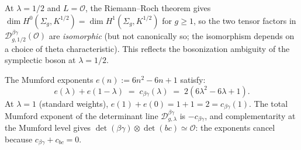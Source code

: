\begin{remark}
\label{rem:betagamma-determinant-bosonization}
At $\lambda = 1/2$ and $L = \mathcal{O}$, the Riemann--Roch theorem gives
$\dim H^0(\Sigma_g, K^{1/2}) = \dim H^1(\Sigma_g, K^{1/2})$ for
$g \geq 1$, so the two tensor factors in
$\mathcal{D}^{\beta\gamma}_{g,1/2}(\mathcal{O})$ are \emph{isomorphic}
(but not canonically so; the isomorphism depends on a choice of theta
characteristic). This reflects the bosonization ambiguity of the
symplectic boson at $\lambda = 1/2$.
\end{remark}

\begin{proposition}
\label{prop:mumford-exponent-complementarity}
\ClaimStatusProvedHere
{}
The Mumford exponents $e(n) := 6n^2 - 6n + 1$ satisfy:
\begin{equation}\label{eq:mumford-exponent-complementarity}
 e(\lambda) + e(1 - \lambda)
 \;=\;
 c_{\beta\gamma}(\lambda)
 \;=\;
 2(6\lambda^2 - 6\lambda + 1).
\end{equation}
At $\lambda = 1$ \textup{(}standard weights\textup{)},
$e(1) + e(0) = 1 + 1 = 2 = c_{\beta\gamma}(1)$. The total
Mumford exponent of the determinant line
$\mathcal{D}^{\beta\gamma}_{g,\lambda}$ is $-c_{\beta\gamma}$, and
complementarity at the Mumford level gives
$\det(\beta\gamma) \otimes \det(bc) \simeq \mathcal{O}$: the
exponents cancel because $c_{\beta\gamma} + c_{bc} = 0$.
\end{proposition}

